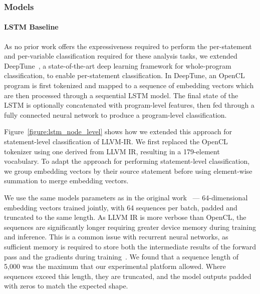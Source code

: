 \subsubsection{Models}%
\label{subsubsec:dataflow_models}

\paragraph{LSTM Baseline} As no prior work offers the expressiveness
required to perform the per-statement and per-variable classification
required for these analysis tasks, we extended
DeepTune~\cite{Cummins2017b}, a state-of-the-art deep learning
framework for whole-program classification, to enable per-statement
classification. In DeepTune, an OpenCL program is first tokenized and
mapped to a sequence of embedding vectors which are then processed
through a sequential LSTM model. The final state of the LSTM is
optionally concatenated with program-level features, then fed through
a fully connected neural network to produce a program-level
classification.

Figure~\ref{figure:lstm_node_level} shows how we extended this
approach for statement-level classification of LLVM-IR. We first
replaced the OpenCL tokenizer using one derived from LLVM IR,
resulting in a 179-element vocabulary. To adapt the approach for
performing statement-level classification, we group embedding vectors
by their source statement before using element-wise summation to merge
embedding vectors.

We use the same models parameters as in the original
work~\cite{Cummins2017b} --- 64-dimensional embedding vectors trained
jointly, with 64 sequences per batch, padded and truncated to the same
length. As LLVM IR is more verbose than OpenCL, the sequences are
significantly longer requiring greater device memory during training
and inference. This is a common issue with recurrent neural networks,
as sufficient memory is required to store both the intermediate
results of the forward pass and the gradients during
training~\cite{Ben-Nun2019a}. We found that a sequence length of 5,000
was the maximum that our experimental platform allowed. Where
sequences exceed this length, they are truncated, and the model
outputs padded with zeros to match the expected shape.


